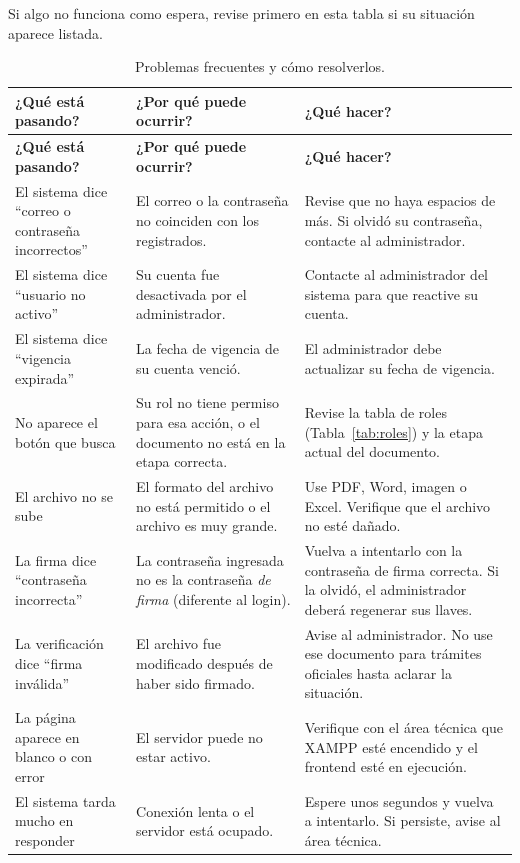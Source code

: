 \documentclass[10pt,letterpaper]{report}
\begin{document}
Si algo no funciona como espera, revise primero en esta tabla si su situación aparece listada.

\begin{longtable}{p{} p{} p{}}
\caption{Problemas frecuentes y cómo resolverlos.}
\label{tab:problemas}\\
\toprule
\textbf{¿Qué está pasando?} & \textbf{¿Por qué puede ocurrir?} & \textbf{¿Qué hacer?} \\
\midrule
\endfirsthead
\toprule
\textbf{¿Qué está pasando?} & \textbf{¿Por qué puede ocurrir?} & \textbf{¿Qué hacer?} \\
\midrule
\endhead
El sistema dice ``correo o contraseña incorrectos'' & El correo o la contraseña no coinciden con los registrados. & Revise que no haya espacios de más. Si olvidó su contraseña, contacte al administrador. \\
\midrule
El sistema dice ``usuario no activo'' & Su cuenta fue desactivada por el administrador. & Contacte al administrador del sistema para que reactive su cuenta. \\
\midrule
El sistema dice ``vigencia expirada'' & La fecha de vigencia de su cuenta venció. & El administrador debe actualizar su fecha de vigencia. \\
\midrule
No aparece el botón que busca & Su rol no tiene permiso para esa acción, o el documento no está en la etapa correcta. & Revise la tabla de roles (Tabla~\ref{tab:roles}) y la etapa actual del documento. \\
\midrule
El archivo no se sube & El formato del archivo no está permitido o el archivo es muy grande. & Use PDF, Word, imagen o Excel. Verifique que el archivo no esté dañado. \\
\midrule
La firma dice ``contraseña incorrecta'' & La contraseña ingresada no es la contraseña \textit{de firma} (diferente al login). & Vuelva a intentarlo con la contraseña de firma correcta. Si la olvidó, el administrador deberá regenerar sus llaves. \\
\midrule
La verificación dice ``firma inválida'' & El archivo fue modificado después de haber sido firmado. & Avise al administrador. No use ese documento para trámites oficiales hasta aclarar la situación. \\
\midrule
La página aparece en blanco o con error & El servidor puede no estar activo. & Verifique con el área técnica que XAMPP esté encendido y el frontend esté en ejecución. \\
\midrule
El sistema tarda mucho en responder & Conexión lenta o el servidor está ocupado. & Espere unos segundos y vuelva a intentarlo. Si persiste, avise al área técnica. \\
\bottomrule
\end{longtable}
\end{document}
